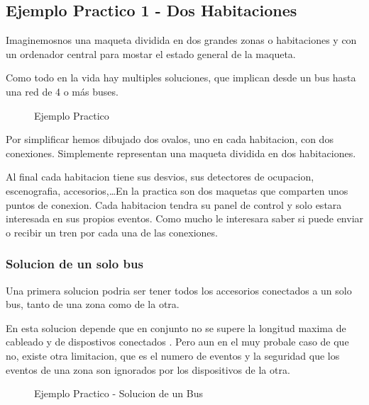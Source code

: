 \subsection{Ejemplo Practico 1 - Dos Habitaciones}
Imaginemosnos una maqueta dividida en dos grandes zonas o habitaciones y con un ordenador central para  mostar el estado general de la maqueta. 

Como todo en la vida hay multiples soluciones, que implican desde un bus hasta una red de 4 o más buses.


\begin{figure}[H]
    \centering
    \begin{tikzpicture}
	
   \end{tikzpicture}

    \caption{Ejemplo Practico}
    \label{fig:ejPractico}
\end{figure}
Por simplificar hemos dibujado dos ovalos, uno en cada habitacion, con dos conexiones. Simplemente representan una maqueta dividida en dos habitaciones.

Al final cada habitacion tiene sus desvios, sus detectores de ocupacion, escenografia, accesorios,\dots En la practica son dos maquetas que comparten unos puntos de conexion. 
Cada habitacion tendra su panel de control y solo estara interesada en sus propios eventos. Como mucho le interesara saber si puede enviar o recibir un tren por cada una de las conexiones.


\subsubsection{Solucion de un solo bus}
Una primera solucion podria ser tener todos los accesorios conectados a un solo bus, tanto de una zona como de la otra.

En esta solucion depende que en conjunto no se supere la longitud maxima de cableado y de dispostivos conectados .
Pero aun en el muy probale caso de que no, existe otra limitacion, que es el numero de eventos y la seguridad que los eventos de una zona son ignorados por los dispositivos de la otra.


\begin{figure}[H]
    \centering

    \caption{Ejemplo Practico - Solucion de un Bus}
    \label{fig:ejPracticoSolUnBus}
\end{figure}

